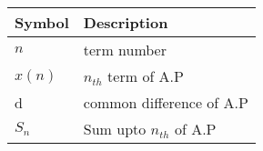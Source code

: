 \begin{tabular}{ | m{1.0cm} | m{4cm} | } 
  \hline
 Symbol & Description \\ 
 \hline
 $n$ & term number \\
 \hline
$x(n)$ & $n_{th}$ term of A.P\\ 
\hline
 d & common difference of A.P \\
\hline
$S_n $& Sum upto $n_{th}$ of A.P \\
\hline

\end{tabular}\\
\caption{}
\label{Table:1}